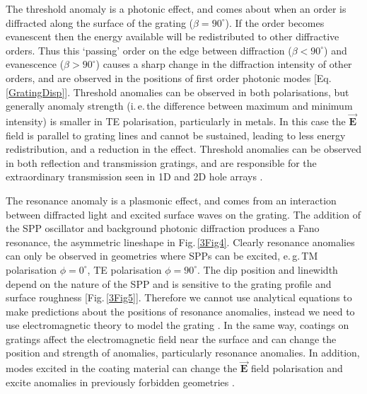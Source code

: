 The threshold anomaly is a photonic effect, and comes about when an order is diffracted along the surface of the grating ($\beta=90^{\circ}$). If the order becomes evanescent then the energy available will be redistributed to other diffractive orders. Thus this `passing' order on the edge between diffraction ($\beta<90^{\circ}$) and evanescence ($\beta>90^{\circ}$) causes a sharp change in the diffraction intensity of other orders, and are observed in the positions of first order photonic modes [Eq.\,\ref{GratingDisp}]. Threshold anomalies can be observed in both polarisations, but generally anomaly strength (i.\,e.\,the difference between maximum and minimum intensity) is smaller in TE polarisation, particularly in metals. In this case the $\vec{\mathbf{E}}$ field is parallel to grating lines and cannot be sustained, leading to less energy redistribution, and a reduction in the effect. Threshold anomalies can be observed in both reflection and transmission gratings, and are responsible for the extraordinary transmission seen in 1D and 2D hole arrays \cite{Fano1941, Hessel1965, Lee2005, Lochbihler1994, Ritchie1968, Treacy2002, Watts1997}.

The resonance anomaly is a plasmonic effect, and comes from an interaction between diffracted light and excited surface waves on the grating. The addition of the SPP oscillator and background photonic diffraction produces a Fano resonance, the asymmetric lineshape in Fig.\,\ref{3Fig4}. Clearly resonance anomalies can only be observed in geometries where SPPs can be excited, e.\,g.\,TM polarisation $\phi=0^{\circ}$, TE polarisation $\phi=90^{\circ}$. The dip position and linewidth depend on the nature of the SPP and is sensitive to the grating profile and surface roughness [Fig.\,\ref{3Fig5}]. Therefore we cannot use analytical equations to make predictions about the positions of resonance anomalies, instead we need to use electromagnetic theory to model the grating \cite{Hutley1982, Loewen1997}. In the same way, coatings on gratings affect the electromagnetic field near the surface and can change the position and strength of anomalies, particularly resonance anomalies. In addition, modes excited in the coating material can change the $\vec{\mathbf{E}}$ field polarisation and excite anomalies in previously forbidden geometries \cite{Hutley1982, Loewen1997}.




